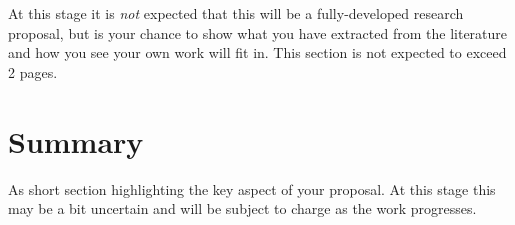 \documentclass[a4paper,12pt]{article}
\begin{document}
At this stage it is {\em not} expected that this will be a fully-developed
research proposal, but is your chance to show what you have extracted from the
literature and how you see your own work will fit in. This section is
not expected to exceed 2 pages.
 
\section{Summary}

As short section highlighting the key aspect of your proposal.
At this stage this may be a bit uncertain and will be subject
to charge as the work progresses.


\end{document}
